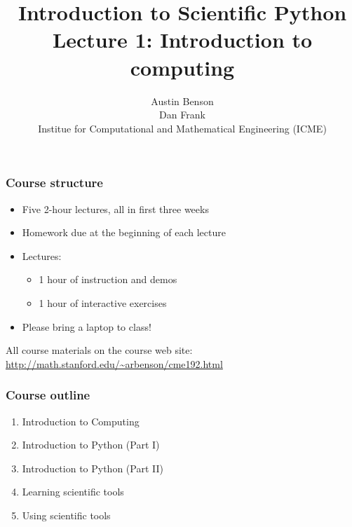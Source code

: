 \documentclass{beamer}
\title{Introduction to Scientific Python \\
Lecture 1: Introduction to computing}
\author{Austin Benson \\
\vspace{0.1in}
Dan Frank \\
\vspace{0.1in}
Institue for Computational and Mathematical Engineering (ICME)}
\begin{document}
\maketitle


\begin{frame}
\frametitle{Course structure}

\begin{itemize}
\setlength{\itemsep}{0.2in}
\item{
Five 2-hour lectures, all in first three weeks
}

\item{
Homework due at the beginning of each lecture
}

\item{
Lectures:
\begin{itemize}
\setlength{\itemsep}{0.05in}
\item{1 hour of instruction and demos}
\item{1 hour of interactive exercises}
\end{itemize}
}

\item{
Please bring a laptop to class!
}
\end{itemize}

\vspace{0.2in}

All course materials on the course web site: \url{http://math.stanford.edu/~arbenson/cme192.html}

\end{frame}

\begin{frame}
\frametitle{Course outline}

\begin{enumerate}
\setlength{\itemsep}{0.2in}

\item{Introduction to Computing}
\item{Introduction to Python (Part I)}
\item{Introduction to Python (Part II)}
\item{Learning scientific tools}
\item{Using scientific tools}

\end{enumerate}

\end{frame}
\end{document}
